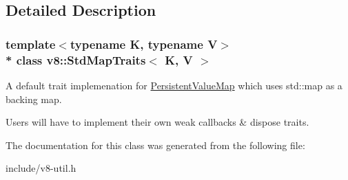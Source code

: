 \subsection{Detailed Description}
\subsubsection*{template$<$typename K, typename V$>$\\*
class v8\+::\+Std\+Map\+Traits$<$ K, V $>$}

A default trait implemenation for \hyperlink{classv8_1_1_persistent_value_map}{Persistent\+Value\+Map} which uses std\+::map as a backing map.

Users will have to implement their own weak callbacks \& dispose traits. 

The documentation for this class was generated from the following file\+:\begin{DoxyCompactItemize}
\item 
include/v8-\/util.\+h\end{DoxyCompactItemize}
